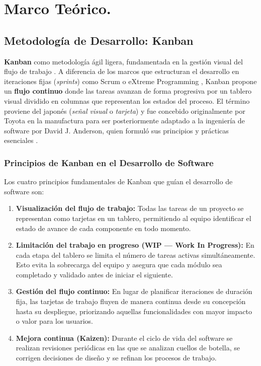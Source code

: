 \chapter{Marco Teórico.}


\section{Metodología de Desarrollo: Kanban}
\label{sec:metodologia-kanban}

 \textbf{Kanban} como metodología ágil ligera, fundamentada en la gestión visual del flujo de trabajo \cite{anderson2010}. A diferencia de los marcos que estructuran el desarrollo en iteraciones fijas (\textit{sprints}) como Scrum \cite{scrumguide} o eXtreme Programming \cite{beck2004}, Kanban propone un \textbf{flujo continuo} donde las tareas avanzan de forma progresiva por un tablero visual dividido en columnas que representan los estados del proceso. El término proviene del japonés (\textit{señal visual} o \textit{tarjeta}) y fue concebido originalmente por Toyota en la manufactura para ser posteriormente adaptado a la ingeniería de software por David J. Anderson, quien formuló sus principios y prácticas esenciales \cite{anderson2010}.

\subsection{Principios de Kanban en el Desarrollo de Software}

Los cuatro principios fundamentales de Kanban que guían el desarrollo de software son:

\begin{enumerate}
    \item \textbf{Visualización del flujo de trabajo:} Todas las tareas de un proyecto se representan como tarjetas en un tablero, permitiendo al equipo identificar el estado de avance de cada componente en todo momento.

    \item \textbf{Limitación del trabajo en progreso (WIP --- Work In Progress):} En cada etapa del tablero se limita el número de tareas activas simultáneamente. Esto evita la sobrecarga del equipo y asegura que cada módulo sea completado y validado antes de iniciar el siguiente.

    \item \textbf{Gestión del flujo continuo:} En lugar de planificar iteraciones de duración fija, las tarjetas de trabajo fluyen de manera continua desde su concepción hasta su despliegue, priorizando aquellas funcionalidades con mayor impacto o valor para los usuarios.

    \item \textbf{Mejora continua (Kaizen):} Durante el ciclo de vida del software se realizan revisiones periódicas en las que se analizan cuellos de botella, se corrigen decisiones de diseño y se refinan los procesos de trabajo.
\end{enumerate}


